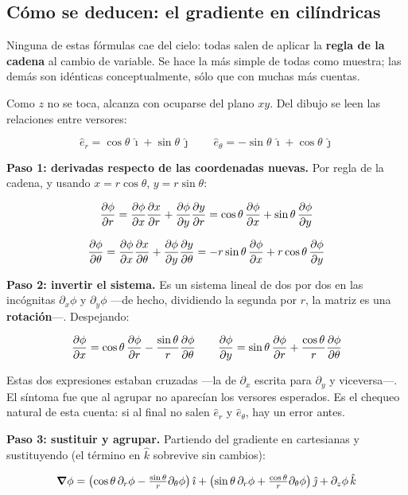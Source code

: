 \documentclass[12pt,a4paper]{article}
\begin{document}
\subsection{Cómo se deducen: el gradiente en cilíndricas}

Ninguna de estas fórmulas cae del cielo: todas salen de aplicar la \textbf{regla
de la cadena} al cambio de variable. Se hace la más simple de todas como muestra;
las demás son idénticas conceptualmente, sólo que con muchas más cuentas.

Como $z$ no se toca, alcanza con ocuparse del plano $xy$. Del dibujo se leen las
relaciones entre versores:

\[
\hat e_r = \cos\theta\,\hat\imath + \sin\theta\,\hat\jmath
\qquad
\hat e_\theta = -\sin\theta\,\hat\imath + \cos\theta\,\hat\jmath
\]

\textbf{Paso 1: derivadas respecto de las coordenadas nuevas.} Por regla de la
cadena, y usando $x = r\cos\theta$, $y = r\sin\theta$:

\[
\pdv{\phi}{r} = \pdv{\phi}{x}\pdv{x}{r} + \pdv{\phi}{y}\pdv{y}{r}
= \cos\theta\,\pdv{\phi}{x} + \sin\theta\,\pdv{\phi}{y}
\]

\[
\pdv{\phi}{\theta} = \pdv{\phi}{x}\pdv{x}{\theta} + \pdv{\phi}{y}\pdv{y}{\theta}
= -r\sin\theta\,\pdv{\phi}{x} + r\cos\theta\,\pdv{\phi}{y}
\]

\textbf{Paso 2: invertir el sistema.} Es un sistema lineal de dos por dos en las
incógnitas $\partial_x\phi$ y $\partial_y\phi$ ---de hecho, dividiendo la segunda
por $r$, la matriz es una \textbf{rotación}---. Despejando:

\[
\pdv{\phi}{x} = \cos\theta\,\pdv{\phi}{r} - \frac{\sin\theta}{r}\pdv{\phi}{\theta}
\qquad
\pdv{\phi}{y} = \sin\theta\,\pdv{\phi}{r} + \frac{\cos\theta}{r}\pdv{\phi}{\theta}
\]

\begin{notebox}
Estas dos expresiones estaban cruzadas ---la de $\partial_x$ escrita para
$\partial_y$ y viceversa---. El síntoma fue que al agrupar no aparecían los
versores esperados. Es el chequeo natural de esta cuenta: si al final no salen
$\hat e_r$ y $\hat e_\theta$, hay un error antes.
\end{notebox}

\textbf{Paso 3: sustituir y agrupar.} Partiendo del gradiente en cartesianas y
sustituyendo (el término en $\hat k$ sobrevive sin cambios):

\[
\grad\phi = \left(\cos\theta\,\partial_r\phi - \tfrac{\sin\theta}{r}\partial_\theta\phi\right)\hat\imath
+ \left(\sin\theta\,\partial_r\phi + \tfrac{\cos\theta}{r}\partial_\theta\phi\right)\hat\jmath
+ \partial_z\phi\,\hat k
\]
\end{document}
